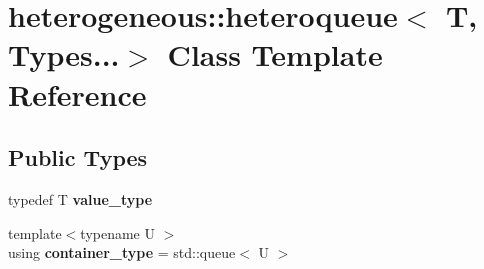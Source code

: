 \hypertarget{classheterogeneous_1_1heteroqueue_3_01_t_00_01_types_8_8_8_4}{}\section{heterogeneous\+:\+:heteroqueue$<$ T, Types...$>$ Class Template Reference}
\label{classheterogeneous_1_1heteroqueue_3_01_t_00_01_types_8_8_8_4}
\subsection*{Public Types}
\begin{DoxyCompactItemize}
\item 
\hypertarget{classheterogeneous_1_1heteroqueue_3_01_t_00_01_types_8_8_8_4_a017b466a2cdfe366654df1891cacc060}{}typedef T {\bfseries value\+\_\+type}\label{classheterogeneous_1_1heteroqueue_3_01_t_00_01_types_8_8_8_4_a017b466a2cdfe366654df1891cacc060}

\item 
\hypertarget{classheterogeneous_1_1heteroqueue_3_01_t_00_01_types_8_8_8_4_a93c7ec516fe369946b2a02142fe34ce6}{}{\footnotesize template$<$typename U $>$ }\\using {\bfseries container\+\_\+type} = std\+::queue$<$ U $>$\label{classheterogeneous_1_1heteroqueue_3_01_t_00_01_types_8_8_8_4_a93c7ec516fe369946b2a02142fe34ce6}

\end{DoxyCompactItemize}
